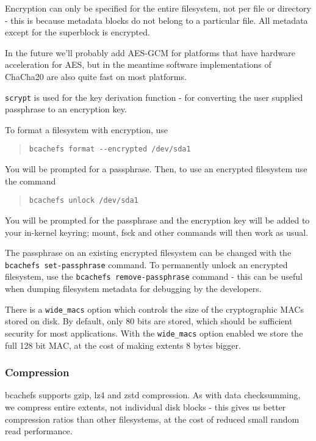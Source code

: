 \documentclass{article}
\begin{document}
Encryption can only be specified for the entire filesystem, not per file or
directory - this is because metadata blocks do not belong to a particular file.
All metadata except for the superblock is encrypted.

In the future we'll probably add AES-GCM for platforms that have hardware
acceleration for AES, but in the meantime software implementations of ChaCha20
are also quite fast on most platforms.

\texttt{scrypt} is used for the key derivation function - for converting the
user supplied passphrase to an encryption key.

To format a filesystem with encryption, use
\begin{quote} \begin{verbatim}
bcachefs format --encrypted /dev/sda1
\end{verbatim} \end{quote}

You will be prompted for a passphrase. Then, to use an encrypted filesystem
use the command
\begin{quote} \begin{verbatim}
bcachefs unlock /dev/sda1
\end{verbatim} \end{quote}

You will be prompted for the passphrase and the encryption key will be added to
your in-kernel keyring; mount, fsck and other commands will then work as usual.

The passphrase on an existing encrypted filesystem can be changed with the
\texttt{bcachefs set-passphrase} command. To permanently unlock an encrypted
filesystem, use the \texttt{bcachefs remove-passphrase} command - this can be
useful when dumping filesystem metadata for debugging by the developers.

There is a \texttt{wide\_macs} option which controls the size of the
cryptographic MACs stored on disk. By default, only 80 bits are stored, which
should be sufficient security for most applications. With the
\texttt{wide\_macs} option enabled we store the full 128 bit MAC, at the cost of
making extents 8 bytes bigger.

\subsubsection{Compression}

bcachefs supports gzip, lz4 and zstd compression. As with data checksumming, we
compress entire extents, not individual disk blocks - this gives us better
compression ratios than other filesystems, at the cost of reduced small random
read performance.
\end{document}
